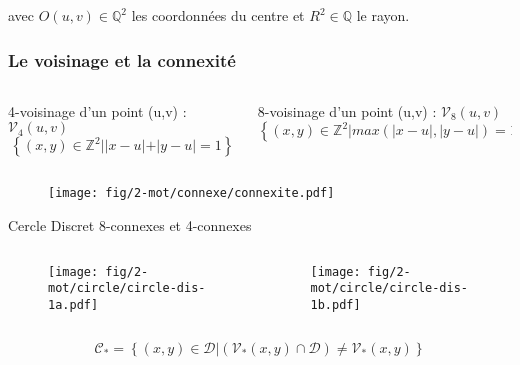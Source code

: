 \begin{frame}
{  \begin{exampleblock}{}
  avec $O(u,v) \in \mathbb{Q}^{2}$ les coordonnées du centre et $R^2 \in \mathbb{Q}$ le rayon.\\
  \end{exampleblock}
}
\end{frame}


\begin{frame}
\frametitle{Le voisinage et la connexité}

\begin{block}{}
  \begin{columns}[t]
    \begin{column}{0.5\linewidth}
      4-voisinage d'un point (u,v) : $\mathcal{V}_4(u,v)$
      $$ \left\{ (x,y) \in \mathbb{Z}^{2} |  |x-u|+|y-u| = 1 \right\}$$
    \end{column}
    \hspace{-1cm}
    \begin{column}{0.5\linewidth}
      8-voisinage d'un point (u,v) : $\mathcal{V}_8(u,v)$
      $$ \left\{ (x,y) \in \mathbb{Z}^{2} |  max(|x-u|,|y-u|) = 1 \right\}$$  
    \end{column}
  \end{columns} 

  \begin{figure}[H]
    \centering
    \texttt{[image: fig/2-mot/connexe/connexite.pdf]}
  \end{figure}
\end{block}

\begin{block}{Cercle Discret 8-connexes et 4-connexes}
  \begin{columns}[t]
    \begin{column}{0.5\linewidth}
      \begin{figure}[H]
        \centering
        \texttt{[image: fig/2-mot/circle/circle-dis-1a.pdf]}

      \end{figure}
      
    \end{column}
    \begin{column}{0.5\linewidth}
      \begin{figure}[H]
        \centering
        \texttt{[image: fig/2-mot/circle/circle-dis-1b.pdf]}
      \end{figure}
    \end{column}
  \end{columns} 

  $$ \mathcal{C}_{*} =  \left\{ (x,y) \in \mathcal{D} | \left( \mathcal{V}_{*}(x,y) \cap \mathcal{D} \right) \neq \mathcal{V}_{*}(x,y) \right\}$$
\end{block}
\end{frame}

